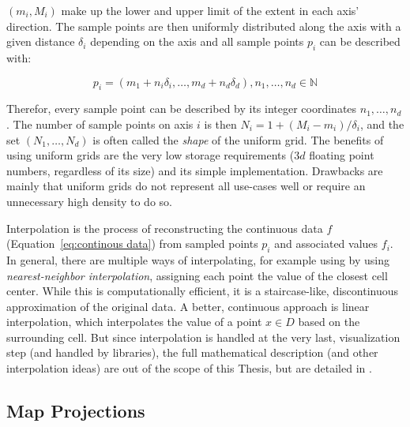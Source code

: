 $(m_i, M_i)$  make up the lower and upper limit of the extent in each axis' direction. 
The sample points are then uniformly distributed along the axis with a given distance $\delta_i$ depending on the axis and all sample points $p_i$ can be described with: 

\begin{equation}
  p_i = (m_1 + n_i\delta_i,\dots, m_d + n_d\delta_d), n_1, \dots, n_d \in \mathbb{N}
  \label{eq:smaple point uniform grid}
\end{equation}

Therefor, every sample point can be described by its integer coordinates $n_1, \dots, n_d$. 
The number of sample points on axis $i$ is then $N_i = 1 + (M_i - m_i)/\delta_i$, and the set $(N_1, \dots, N_d)$ is often called the \textit{shape} of the uniform grid.   
The benefits of using uniform grids are the very low storage requirements ($3d$ floating point numbers, regardless of its size) and its simple implementation. 
Drawbacks are mainly that uniform grids do not represent all use-cases well or require an unnecessary high density to do so. 


Interpolation is the process of reconstructing the continuous data $f$ (Equation~\ref{eq:continous data}) from sampled points $p_i$ and associated values $f_i$. 
In general, there are multiple ways of interpolating, for example using by using \textit{nearest-neighbor interpolation}, assigning each point the value of the closest cell center. 
While this is computationally efficient, it is a staircase-like, discontinuous approximation of the original data. 
A better, continuous approach is linear interpolation, which interpolates the value of a point $x \in D$ based on the surrounding cell. 
But since interpolation is handled at the very last, visualization step (and handled by libraries), the full mathematical description (and other interpolation ideas) are out of the scope of this Thesis, but are detailed in . 

\subsection{Map Projections}
\label{sec:map projections}

